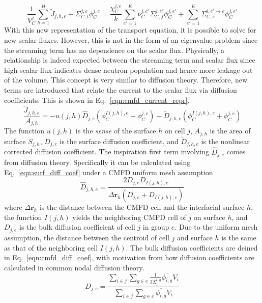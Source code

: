 \begin{equation}
	\frac{1}{V_C^j} \sum_{h=1}^H \tilde{J}_{j,h,e} + \Sigma_{C,t}^{j,e} \phi_C^{j,e} = \frac{\chi_C^{j,e}}{k} \sum_{e'=1}^{E} \nu_C^{j, e'} \Sigma_{C,f}^{j,e'} \phi_C^{j,e'} + \sum_{e'=1}^E  \Sigma_{C,s}^{i, e' \rightarrow e} \phi_C^{j,e'}
	\label{eqn:transport_partial_current_1}
\end{equation}
With this new representation of the transport equation, it is possible to solve for new scalar fluxes. However, this is not in the form of an eigenvalue problem since the streaming term has no dependence on the scalar flux. Physically, a relationship is indeed expected between the streaming term and scalar flux since high scalar flux indicates dense neutron population and hence more leakage out of the volume. This concept is very similar to diffusion theory. Therefore, new terms are introduced that relate the current to the scalar flux via diffusion coefficients. This is shown in Eq.~\ref{eqn:cmfd_current_repr}.
\begin{equation}
	\frac{\tilde{J}_{j,h,e}}{A_{j,h}} = - u(j,h) \hat{D}_{j,e} \left(\phi_C^{I(j,h),e} - \phi_C^{j,e}\right) - \tilde{D}_{j,h,e} \left(\phi_C^{I(j,h),e} + \phi_C^{j,e}\right)
	\label{eqn:cmfd_current_repr}
\end{equation}
The function $u(j,h)$ is the \textit{sense} of the surface $h$ on cell $j$, $A_{j,h}$ is the area of surface $S_{j,h}$, $\hat{D}_{j,e}$ is the surface diffusion coefficient, and $\tilde{D}_{j,h,e}$ is the nonlinear corrected diffusion coefficient. The inspiration first term involving $\hat{D}_{j,e}$ comes from diffusion theory. Specifically it can be calculated using Eq.~\ref{eqn:surf_diff_coef} under a CMFD uniform mesh assumption
\begin{equation}
	\hat{D}_{j,h,e} = \frac{2 D_{j,e} D_{I(j,h),e}}{\Delta \mathbf{r}_h \left( D_{j,e} + D_{I(j,h),e} \right)}
	\label{eqn:surf_diff_coef}
\end{equation}
where $\Delta \mathbf{r}_h$ is the distance between the CMFD cell and the interfacial surface $h$, the function $I(j,h)$ yields the neighboring CMFD cell of $j$ on surface $h$, and $D_{j,e}$ is the bulk diffusion coefficient of cell $j$ in group $e$. Due to the uniform mesh assumption, the distance between the centroid of cell $j$ and surface $h$ is the same as that of the neighboring cell $I(j,h)$. The bulk diffusion coefficients are deined in Eq.~\ref{eqn:cmfd_diff_coef}, with motivation from how diffusion coefficients are calculated in common nodal diffusion theory.
\begin{equation}
	D_{j,e} = \frac{\sum_{i \in j} \sum_{g \in e} \frac{1}{3\Sigma_{t}^{i, g}} \overline{\phi_{i,g}} V_i}{\sum_{i \in j} \sum_{g \in e} \overline{\phi_{i,g}} V_i}
	\label{eqn:cmfd_diff_coef}
\end{equation}
